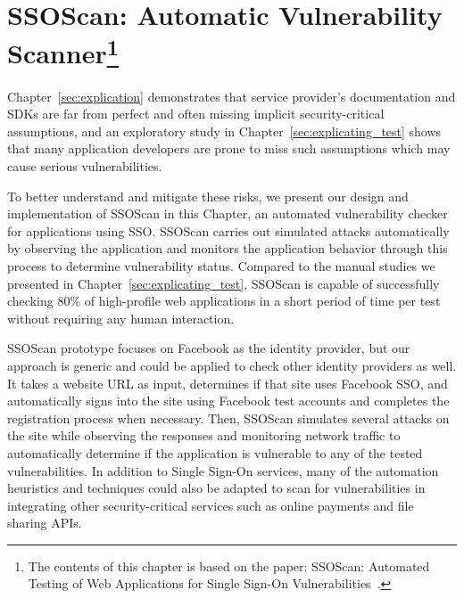 \chapter[SSOScan: Automatic Vulnerability Scanner]{SSOScan: Automatic Vulnerability Scanner\footnote{The contents of this chapter is based on the paper: SSOScan: Automated Testing of Web Applications for Single Sign-On Vulnerabilities~\cite{SSOScan}.}}
\label{sec:ssoscan}

Chapter~\ref{sec:explication} demonstrates that service provider's documentation and SDKs are far from perfect and often missing implicit security-critical assumptions, and an exploratory study in Chapter~\ref{sec:explicating_test} shows that many application developers are prone to miss such assumptions which may cause serious vulnerabilities.  

To better understand and mitigate these risks, we present our design and implementation of SSOScan in this Chapter, an automated vulnerability checker for applications using SSO.  SSOScan carries out simulated attacks automatically by observing the application and monitors the application behavior through this process to determine vulnerability status.  Compared to the manual studies we presented in Chapter~\ref{sec:explicating_test}, SSOScan is capable of successfully checking 80\% of high-profile web applications in a short period of time per test without requiring any human interaction.  

SSOScan prototype focuses on Facebook as the identity provider, but our approach is generic and could be applied to check other identity providers as well.  It takes a website URL as input, determines if that site uses Facebook SSO, and automatically signs into the site using Facebook test accounts and completes the registration process when necessary.  Then, SSOScan simulates several attacks on the site while observing the responses and monitoring network traffic to automatically determine if the application is vulnerable to any of the tested vulnerabilities.  In addition to Single Sign-On services, many of the automation heuristics and techniques could also be adapted to scan for vulnerabilities in integrating other security-critical services such as online payments and file sharing APIs.

